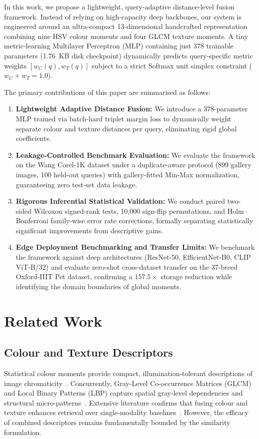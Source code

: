 \documentclass[pdflatex,sn-mathphys-num]{sn-jnl}
\begin{document}
In this work, we propose a lightweight, query-adaptive distance-level fusion framework. Instead of relying on high-capacity deep backbones, our system is engineered around an ultra-compact 13-dimensional handcrafted representation combining nine HSV colour moments and four GLCM texture moments. A tiny metric-learning Multilayer Perceptron (MLP) containing just 378 trainable parameters (1.76~KB disk checkpoint) dynamically predicts query-specific metric weights $[w_C(q), w_T(q)]$ subject to a strict Softmax unit simplex constraint ($w_C + w_T = 1.0$).

The primary contributions of this paper are summarised as follows:
\begin{enumerate}
    \item \textbf{Lightweight Adaptive Distance Fusion:} We introduce a 378-parameter MLP trained via batch-hard triplet margin loss to dynamically weight separate colour and texture distances per query, eliminating rigid global coefficients.
    \item \textbf{Leakage-Controlled Benchmark Evaluation:} We evaluate the framework on the Wang Corel-1K dataset under a duplicate-aware protocol (899 gallery images, 100 held-out queries) with gallery-fitted Min-Max normalization, guaranteeing zero test-set data leakage.
    \item \textbf{Rigorous Inferential Statistical Validation:} We conduct paired two-sided Wilcoxon signed-rank tests, 10,000 sign-flip permutations, and Holm--Bonferroni family-wise error rate corrections, formally separating statistically significant improvements from descriptive gains.
    \item \textbf{Edge Deployment Benchmarking and Transfer Limits:} We benchmark the framework against deep architectures (ResNet-50, EfficientNet-B0, CLIP ViT-B/32) and evaluate zero-shot cross-dataset transfer on the 37-breed Oxford-IIIT Pet dataset, confirming a $157.5\times$ storage reduction while identifying the domain boundaries of global moments.
\end{enumerate}

\section{Related Work}\label{sec2}
\subsection{Colour and Texture Descriptors}
Statistical colour moments provide compact, illumination-tolerant descriptions of image chromaticity~\cite{stricker1995similarity}. Concurrently, Gray-Level Co-occurrence Matrices (GLCM) and Local Binary Patterns (LBP) capture spatial gray-level dependencies and structural micro-patterns~\cite{ojala2002multiresolution,chun2008cbir}. Extensive literature confirms that fusing colour and texture enhances retrieval over single-modality baselines~\cite{singh2018color,yue2011cbir,wang2014content}. However, the efficacy of combined descriptors remains fundamentally bounded by the similarity formulation.
\end{document}
